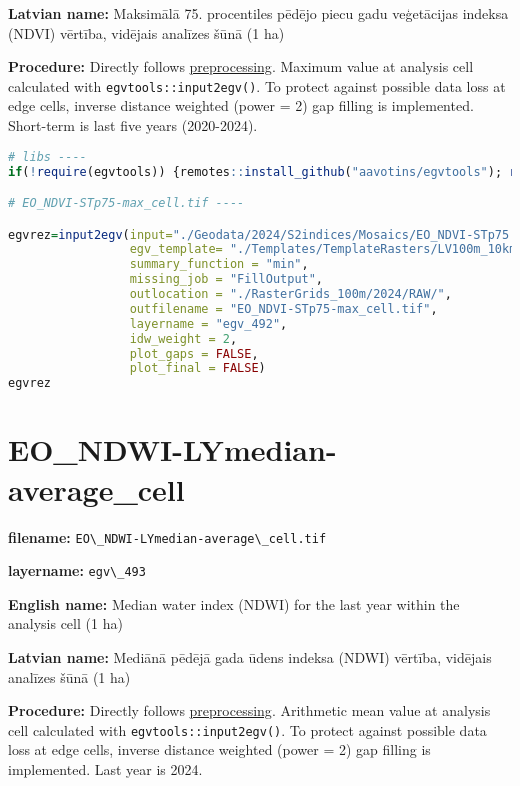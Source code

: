 \documentclass[
]{book}
\newcommand{\passthrough}[1]{#1}
\begin{document}
\textbf{Latvian name:} Maksimālā 75. procentiles pēdējo piecu gadu veģetācijas indeksa (NDVI) vērtība, vidējais analīzes šūnā (1 ha)

\textbf{Procedure:} Directly follows \hyperref[Ch04.13]{preprocessing}. Maximum value at analysis cell
calculated with \passthrough{\lstinline!egvtools::input2egv()!}. To protect against possible data loss at edge cells,
inverse distance weighted (power = 2) gap filling is implemented. Short-term is last five years (2020-2024).

\begin{lstlisting}[language=R]
# libs ----
if(!require(egvtools)) {remotes::install_github("aavotins/egvtools"); require(egvtools)}

# EO_NDVI-STp75-max_cell.tif ----

egvrez=input2egv(input="./Geodata/2024/S2indices/Mosaics/EO_NDVI-STp75.tif",
                 egv_template= "./Templates/TemplateRasters/LV100m_10km.tif",
                 summary_function = "min",
                 missing_job = "FillOutput",
                 outlocation = "./RasterGrids_100m/2024/RAW/",
                 outfilename = "EO_NDVI-STp75-max_cell.tif",
                 layername = "egv_492",
                 idw_weight = 2,
                 plot_gaps = FALSE,
                 plot_final = FALSE)
egvrez
\end{lstlisting}

\section{EO\_NDWI-LYmedian-average\_cell}\label{ch06.493}

\textbf{filename:} \passthrough{\lstinline!EO\_NDWI-LYmedian-average\_cell.tif!}

\textbf{layername:} \passthrough{\lstinline!egv\_493!}

\textbf{English name:} Median water index (NDWI) for the last year within the analysis cell (1 ha)

\textbf{Latvian name:} Mediānā pēdējā gada ūdens indeksa (NDWI) vērtība, vidējais analīzes šūnā (1 ha)

\textbf{Procedure:} Directly follows \hyperref[Ch04.13]{preprocessing}. Arithmetic mean value at analysis cell
calculated with \passthrough{\lstinline!egvtools::input2egv()!}. To protect against possible data loss at edge cells,
inverse distance weighted (power = 2) gap filling is implemented. Last year is 2024.
\end{document}
